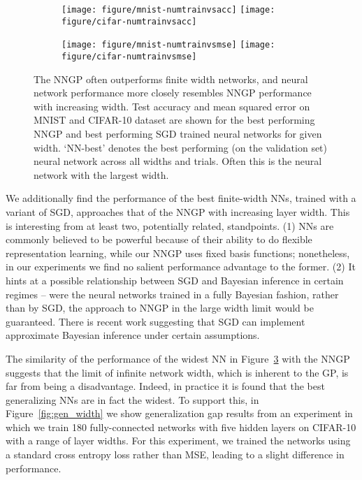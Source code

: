 \documentclass{article} %
\begin{document}
\begin{figure}[ht]
  \begin{subfigure}[b]{0.5\textwidth}
  \texttt{[image: figure/mnist-numtrainvsacc]}
  \texttt{[image: figure/cifar-numtrainvsacc]}
   \label{fig:acc}
  \end{subfigure}
  \begin{subfigure}[b]{0.5\textwidth}
  
 \texttt{[image: figure/mnist-numtrainvsmse]}
  \texttt{[image: figure/cifar-numtrainvsmse]}
   \label{fig:mse}
  \end{subfigure}
  \caption{The NNGP often outperforms finite width networks, and neural network performance more closely resembles NNGP performance with increasing width. Test accuracy and mean squared error on MNIST and CIFAR-10 dataset are shown for the best performing NNGP and best performing SGD trained neural networks for given width. `NN-best' denotes the best performing (on the validation set) neural network across all widths and trials. Often this is the neural network with the largest width.}
  \label{fig:gpvsnn}
\end{figure}

We additionally find the performance of the best finite-width NNs, trained with a variant of SGD, approaches that of the NNGP with increasing layer width. This is interesting from at least two, potentially related, standpoints. (1) NNs are commonly believed to be powerful because of their ability to do flexible representation learning, while our NNGP uses fixed basis functions; nonetheless, in our experiments we find no salient performance advantage to the former. (2) It hints at a possible relationship between SGD and Bayesian inference in certain regimes -- were the neural networks trained in a fully Bayesian fashion, rather than by SGD, the approach to NNGP in the large width limit would be guaranteed. There is recent work suggesting that SGD can implement approximate Bayesian inference \citep{mandt2017} under certain assumptions.

The similarity of the performance of the widest NN in Figure~\ref{fig:gpvsnn} with the NNGP suggests that the limit of infinite network width, which is inherent to the GP, is far from being a disadvantage. Indeed, in practice it is found that the best generalizing NNs are in fact the widest. To support this, in Figure~\ref{fig:gen_width} we show generalization gap results from an experiment in which we train 180 fully-connected networks with five hidden layers on CIFAR-10 with a range of layer widths. For this experiment, we trained the networks using a standard cross entropy loss rather than MSE, leading to a slight difference in performance.
\end{document}

